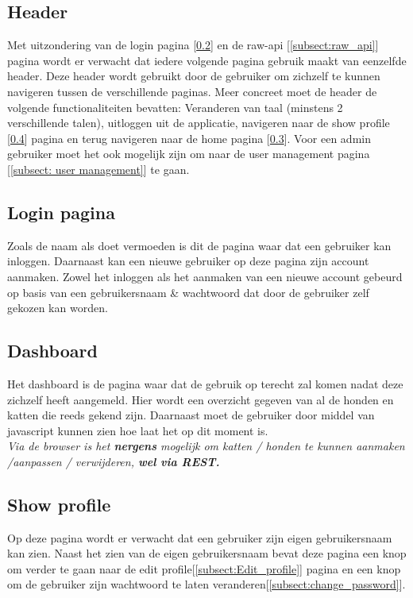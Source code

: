 \documentclass{article}
\begin{document}
\subsection{Header}
Met uitzondering van de login pagina [\ref{subsect:login_pagina}] en de raw-api [\ref{subsect:raw_api}] pagina wordt er verwacht dat iedere volgende pagina gebruik maakt van eenzelfde header. Deze header wordt gebruikt door de gebruiker om zichzelf te kunnen navigeren tussen de verschillende paginas. Meer concreet moet de header de volgende functionaliteiten bevatten: Veranderen van taal (minstens 2 verschillende talen), uitloggen uit de applicatie,  navigeren naar de show profile [\ref{subsect:show_profile}] pagina en terug navigeren naar de home pagina [\ref{subsect:home_page}]. Voor een admin gebruiker moet het ook mogelijk zijn om naar de user management pagina [\ref{subsect: user management}] te gaan.

\subsection{Login pagina} 
\label{subsect:login_pagina}
Zoals de naam als doet vermoeden is dit de pagina waar dat een gebruiker kan inloggen. Daarnaast kan een nieuwe gebruiker op deze pagina zijn account aanmaken. Zowel het inloggen als het aanmaken van een nieuwe account gebeurd op basis van een gebruikersnaam \& wachtwoord dat door de gebruiker zelf gekozen kan worden. 

\subsection{Dashboard} 
\label{subsect:home_page}
Het dashboard is de pagina waar dat de gebruik op terecht zal komen nadat deze zichzelf heeft aangemeld. Hier wordt een overzicht gegeven van al de honden en katten die reeds gekend zijn. Daarnaast moet de gebruiker door middel van javascript kunnen zien hoe laat het op dit moment is. \\

\textit{Via de browser is het \textbf{nergens} mogelijk om katten / honden te kunnen aanmaken /aanpassen / verwijderen, \textbf{wel via REST.}}

\subsection{Show profile}
\label{subsect:show_profile}
Op deze pagina wordt er verwacht dat een gebruiker zijn eigen gebruikersnaam kan zien. Naast het zien van de eigen gebruikersnaam bevat deze pagina een knop om verder te gaan naar de edit profile[\ref{subsect:Edit_profile}] pagina en een knop om de gebruiker zijn wachtwoord te laten veranderen[\ref{subsect:change_password}]. \\
\end{document}

